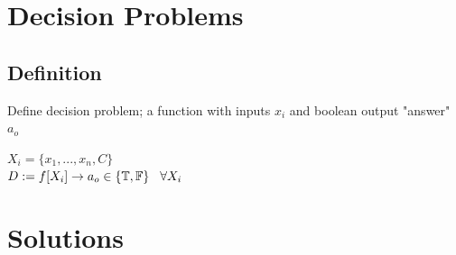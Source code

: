 \documentclass[11pt]{article}
\def \loop {\ensuremath{\rotatebox[origin=c]{-90}{$\circlearrowright$}}}
\def \nestedloop {\ensuremath{\rotatebox[origin=c]{-90}{$\circlearrowright$}}^n}
\begin{document}
















\newpage
\section{Decision Problems}

\subsection{Definition}
Define decision problem; a function with inputs $x_i$ and boolean output "answer" $a_o$
\begin{center}
$
X_i = \{x_1,...,x_n,C\}
$
\\ \vspace{2mm}
$
D := f \lbrack X_i \rbrack \rightarrow a_{o} \in \{\mathbb{T}, \mathbb{F}\} \hspace{3mm} \forall X_i
$
\end{center}







\section{Solutions}
\end{document}
